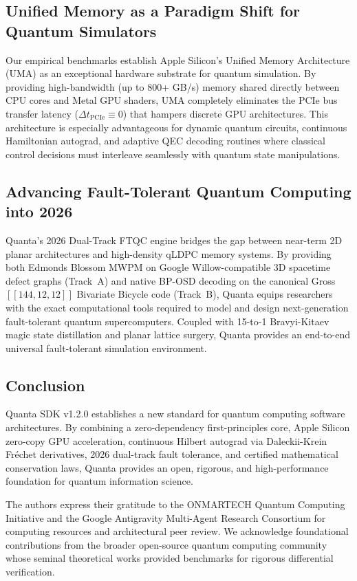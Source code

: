 \documentclass[aps,prx,twocolumn,superscriptaddress,nofootinbib]{revtex4-2}
\begin{document}
\subsection{Unified Memory as a Paradigm Shift for Quantum Simulators}
Our empirical benchmarks establish Apple Silicon's Unified Memory Architecture (UMA) as an exceptional hardware substrate for quantum simulation. By providing high-bandwidth (up to 800+ GB/s) memory shared directly between CPU cores and Metal GPU shaders, UMA completely eliminates the PCIe bus transfer latency ($\Delta t_{\text{PCIe}} \equiv 0$) that hampers discrete GPU architectures. This architecture is especially advantageous for dynamic quantum circuits, continuous Hamiltonian autograd, and adaptive QEC decoding routines where classical control decisions must interleave seamlessly with quantum state manipulations.

\subsection{Advancing Fault-Tolerant Quantum Computing into 2026}
Quanta's 2026 Dual-Track FTQC engine bridges the gap between near-term 2D planar architectures and high-density qLDPC memory systems. By providing both Edmonds Blossom MWPM on Google Willow-compatible 3D spacetime defect graphs (Track~A) and native BP-OSD decoding on the canonical Gross $[[144, 12, 12]]$ Bivariate Bicycle code (Track~B), Quanta equips researchers with the exact computational tools required to model and design next-generation fault-tolerant quantum supercomputers. Coupled with 15-to-1 Bravyi-Kitaev magic state distillation and planar lattice surgery, Quanta provides an end-to-end universal fault-tolerant simulation environment.

\subsection{Conclusion}
Quanta SDK v1.2.0 establishes a new standard for quantum computing software architectures. By combining a zero-dependency first-principles core, Apple Silicon zero-copy GPU acceleration, continuous Hilbert autograd via Daleckii-Krein Fr\'echet derivatives, 2026 dual-track fault tolerance, and certified mathematical conservation laws, Quanta provides an open, rigorous, and high-performance foundation for quantum information science.

\begin{acknowledgments}
The authors express their gratitude to the ONMARTECH Quantum Computing Initiative and the Google Antigravity Multi-Agent Research Consortium for computing resources and architectural peer review. We acknowledge foundational contributions from the broader open-source quantum computing community whose seminal theoretical works provided benchmarks for rigorous differential verification.
\end{acknowledgments}


\end{document}

